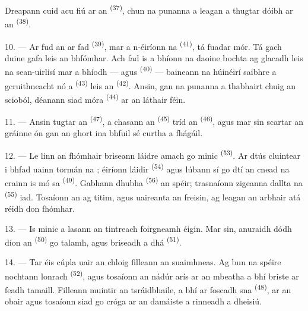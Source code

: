 Dreapann cuid acu fiú ar an  \textsuperscript{(37)}, chun na punanna
a leagan a thugtar dóibh ar an  \textsuperscript{(38)}.

10. --- Ar fud an  ar fad \textsuperscript{(39)}, mar a n-éiríonn
na  \textsuperscript{(41)}, tá fuadar mór. Tá gach duine gafa leis
an bhfómhar. Ach fad is a bhíonn na daoine bochta ag glacadh leis na sean-uirlisí
mar a bhíodh ---  agus 
\textsuperscript{(40)} --- baineann na húinéirí saibhre a gcruithneacht nó a
 \textsuperscript{(43)} leis an 
\textsuperscript{(42)}. Ansin, gan na punanna a thabhairt chuig an scioból,
déanann siad  móra \textsuperscript{(44)} ar an láthair féin.

11. --- Ansin tugtar an  \textsuperscript{(47)}, a
chasann an  \textsuperscript{(45)} tríd an  \textsuperscript{(46)}, agus mar sin scartar an gráinne ón
 gan an ghort ina bhfuil sé curtha a fhágáil.

\VUsaut{5.0mm}
\VUsaut{3.4mm}

12. --- Le linn an fhómhair briseann  láidre amach go minic
\textsuperscript{(53)}. Ar dtús cluintear i bhfad uainn tormán na
; éiríonn  láidir \textsuperscript{(54)} agus
lúbann sí go dtí an cnead na crainn is mó sa 
\textsuperscript{(49)}. Gabhann  dhubha \textsuperscript{(56)} an
spéir; trasnaíonn zigeanna dallta na  \textsuperscript{(55)} iad.
Tosaíonn an  ag titim, agus uaireanta an  freisin, ag leagan an arbhair atá réidh don fhómhar.

13. --- Is minic a lasann an tintreach foirgneamh éigin. Mar sin, anuraidh dódh
díon an  \textsuperscript{(50)} go talamh, agus briseadh a
dhá  \textsuperscript{(51)}.

14. --- Tar éis cúpla uair an chloig filleann an suaimhneas. Ag bun na spéire
nochtann  lonrach \textsuperscript{(52)}, agus tosaíonn an
nádúr arís ar an mbeatha a bhí briste ar feadh tamaill. Filleann muintir an
tsráidbhaile, a bhí ar foscadh sna  \textsuperscript{(48)}, ar an
obair agus tosaíonn siad go cróga ar an damáiste a rinneadh a dheisiú.

